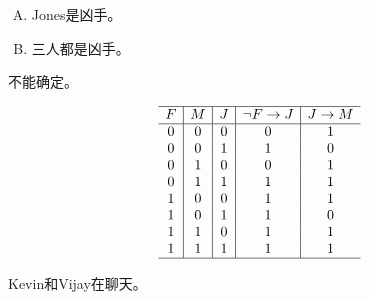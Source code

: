 {{        %
        \begin{practices}
            \begin{enumerate}[A.]
                \item Jones是凶手。
                \item 三人都是凶手。
            \end{enumerate}
        \end{practices}

        \begin{practices}
            不能确定。

            \begin{table}[H]
                \[
                    \begin{array}{c|c|c|c|c}
                        \hline
                        F & M & J & \neg F \rightarrow J & J \rightarrow M \\
                        \hline
                        0 & 0 & 0 & 0 & 1 \\
                        0 & 0 & 1 & 1 & 0 \\
                        0 & 1 & 0 & 0 & 1 \\
                        0 & 1 & 1 & 1 & 1 \\
                        1 & 0 & 0 & 1 & 1 \\
                        1 & 0 & 1 & 1 & 0 \\
                        1 & 1 & 0 & 1 & 1 \\
                        1 & 1 & 1 & 1 & 1 \\
                        \hline
                   \end{array}
               \]
            \end{table}
        \end{practices}

        \begin{practices}
            Kevin和Vijay在聊天。


\end{practices}}}
